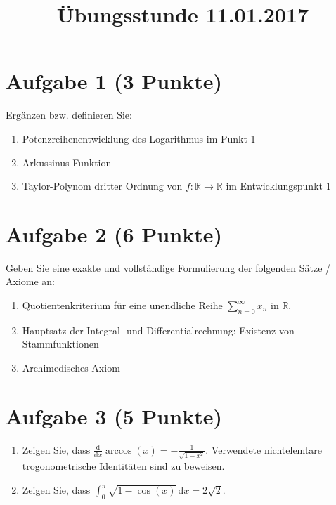 \documentclass[a4paper]{article}
\title{Übungsstunde 11.01.2017}
\date{}
\author{}
\newcommand*{\R}{\mathbb R}
\newcommand*{\dx}{\,\mathrm{d}x}
\begin{document}
\maketitle

\section{Aufgabe 1 (3 Punkte)}

Ergänzen bzw. definieren Sie:

\begin{enumerate}
  \item Potenzreihenentwicklung des Logarithmus im Punkt 1 %
  \item Arkussinus-Funktion %
  \item Taylor-Polynom dritter Ordnung von $f:\R\to\R$ im Entwicklungspunkt 1 %
\end{enumerate}

\section{Aufgabe 2 (6 Punkte)}

Geben Sie eine exakte und vollständige Formulierung der folgenden Sätze / Axiome an:

\begin{enumerate}
  \item Quotientenkriterium für eine unendliche Reihe $\sum_{n=0}^\infty x_n$ in $\R$. %
  \item Hauptsatz der Integral- und Differentialrechnung: Existenz von Stammfunktionen %
  \item Archimedisches Axiom
\end{enumerate}

\section{Aufgabe 3 (5 Punkte)} %

\begin{enumerate}
  \item Zeigen Sie, dass $\frac{\mathrm d}{\mathrm dx} \operatorname{arccos}(x) = -\frac{1}{\sqrt{1-x^2}}$. Verwendete nichtelemtare trogonometrische Identitäten sind zu beweisen. %
  \item Zeigen Sie, dass $\int_0^\pi \sqrt{1-\cos(x)} \dx = 2\sqrt 2$. %
\end{enumerate}
\end{document}

